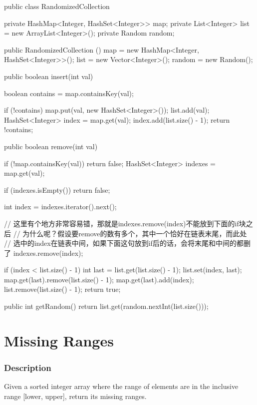 \begin{Code}
public class RandomizedCollection {

    private HashMap<Integer, HashSet<Integer>> map;
    private List<Integer> list = new ArrayList<Integer>();
    private Random random;

    public RandomizedCollection () {
        map = new HashMap<Integer, HashSet<Integer>>();
        list = new Vector<Integer>();
        random = new Random();
    }

    public boolean insert(int val) {
        boolean contains = map.containsKey(val);

        if (!contains) {
            map.put(val, new HashSet<Integer>());
        }
        list.add(val);
        HashSet<Integer> index = map.get(val);
        index.add(list.size() - 1);
        return !contains;
    }

    public boolean remove(int val) {
        if (!map.containsKey(val)) {
            return false;
        }
        HashSet<Integer> indexes = map.get(val);

        if (indexes.isEmpty()) {
            return false;
        }

        int index = indexes.iterator().next();

         // 这里有个地方非常容易错，那就是indexes.remove(index)不能放到下面的if块之后
         // 为什么呢？假设要remove的数有多个，其中一个恰好在链表末尾，而此处
         // 选中的index在链表中间，如果下面这句放到if后的话，会将末尾和中间的都删了
        indexes.remove(index);

        if (index < list.size() - 1) {
            int last = list.get(list.size() - 1);
            list.set(index, last);
            map.get(last).remove(list.size() - 1);
            map.get(last).add(index);
        }
        list.remove(list.size() - 1);
        return true;
    }

    public int getRandom() {
        return list.get(random.nextInt(list.size()));
    }
}
\end{Code}

\newpage

\section{Missing Ranges} %

\subsubsection{Description}
Given a sorted integer array where the range of elements are in the inclusive range [lower, upper], return its missing ranges.

